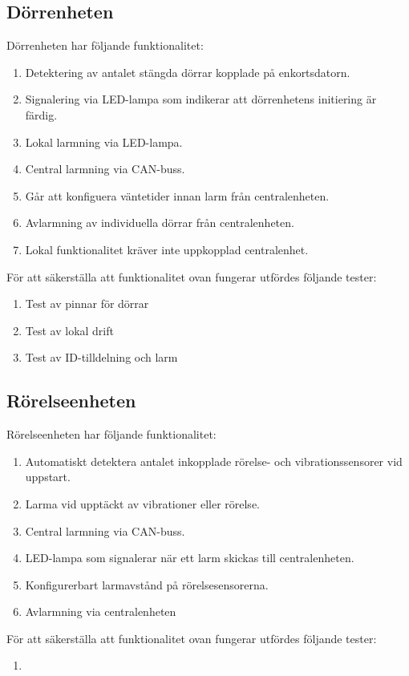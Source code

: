 \documentclass{article}
\begin{document}
 \subsection{Dörrenheten}
 Dörrenheten har följande funktionalitet:
 \begin{enumerate}
     \item Detektering av antalet stängda dörrar kopplade på enkortsdatorn.
     \item Signalering via LED-lampa som indikerar att dörrenhetens initiering är färdig.
     \item Lokal larmning via LED-lampa.
     \item Central larmning via CAN-buss.
     \item Går att konfiguera väntetider innan larm från centralenheten.
     \item Avlarmning av individuella dörrar från centralenheten.
     \item Lokal funktionalitet kräver inte uppkopplad centralenhet.

 \end{enumerate}
 För att säkerställa att funktionalitet ovan fungerar utfördes följande tester:
 \begin{enumerate}
     \item Test av pinnar för dörrar
     \item Test av lokal drift
     \item Test av ID-tilldelning och larm
 \end{enumerate}

 \subsection{Rörelseenheten}
 Rörelseenheten har följande funktionalitet:
 \begin{enumerate}
 	\item Automatiskt detektera antalet inkopplade rörelse- och vibrationssensorer vid uppstart.
	\item Larma vid upptäckt av vibrationer eller rörelse.
    \item Central larmning via CAN-buss.
	\item LED-lampa som signalerar när ett larm skickas till centralenheten.
	\item Konfigurerbart larmavstånd på rörelsesensorerna.
	\item Avlarmning via centralenheten
 \end{enumerate}
 För att säkerställa att funktionalitet ovan fungerar utfördes följande tester:
 \begin{enumerate}
     \item
 \end{enumerate}
 
\end{document}

